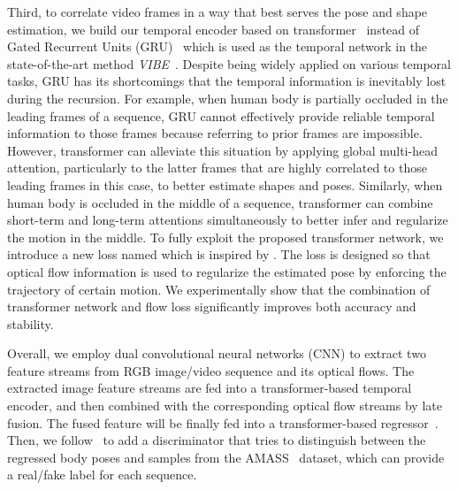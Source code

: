 \documentclass[10pt,twocolumn,letterpaper]{article}
\begin{document}
Third, to correlate video frames in a way that best serves the pose and shape estimation, we build our temporal encoder based on transformer~\cite{vaswani2017attention} instead of Gated Recurrent Units (GRU)~\cite{cho2014learning} which is used as the temporal network in the state-of-the-art method \emph{VIBE}~\cite{kocabas2020vibe}. Despite being widely applied on various temporal tasks, GRU has its shortcomings that the temporal information is inevitably lost during the recursion. For example, when human body is partially occluded in the leading frames of a sequence, GRU cannot effectively provide reliable temporal information to those frames because referring to prior frames are impossible. However, transformer can alleviate this situation by applying global multi-head attention, particularly to the latter frames that are highly correlated to those leading frames in this case, to better estimate shapes and poses. Similarly, when human body is occluded in the middle of a sequence, transformer can combine short-term and long-term attentions simultaneously to better infer and regularize the motion in the middle. To fully exploit the proposed transformer network, we introduce a new loss named  which is inspired by \cite{dong2018supervision}. The loss is designed so that optical flow information is used to regularize the estimated pose by enforcing the trajectory of certain motion. We experimentally show that the combination of transformer network and flow loss significantly improves both accuracy and stability.
\par
Overall, we employ dual convolutional neural networks (CNN) to extract two feature streams from RGB image/video sequence and its optical flows. The extracted image feature streams are fed into a transformer-based temporal encoder, and then combined with the corresponding optical flow streams by late fusion. The fused feature will be finally fed into a transformer-based regressor~\cite{vaswani2017attention}. Then, we follow~\cite{kocabas2020vibe} to add a discriminator that tries to distinguish between the regressed body poses and samples from the AMASS~\cite{kanazawa2019learning} dataset, which can provide a real/fake label for each sequence.
\end{document}
